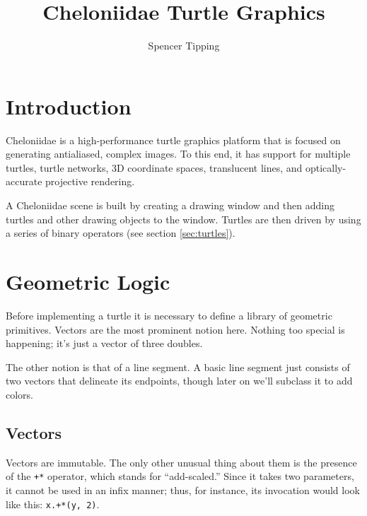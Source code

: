 \documentclass{article}
\title{Cheloniidae Turtle Graphics}
\author{Spencer Tipping}
\begin{document}
  \maketitle

  \tableofcontents

  \section{Introduction}
    \label{sec:introduction}

    Cheloniidae is a high-performance turtle graphics platform that is focused on generating antialiased, complex images. To this end, it has support for
    multiple turtles, turtle networks, 3D coordinate spaces, translucent lines, and optically-accurate projective rendering.

    A Cheloniidae scene is built by creating a drawing window and then adding turtles and other drawing objects to the window. Turtles are then driven by using
    a series of binary operators (see section \ref{sec:turtles}).

    \begin{scalacode}
object cheloniidae {

import java.awt.Color
import java.awt.Frame
    \end{scalacode}

  \section{Geometric Logic}
    \label{sec:geometric-logic}

    Before implementing a turtle it is necessary to define a library of geometric primitives. Vectors are the most prominent notion here. Nothing too special is
    happening; it's just a vector of three doubles.

    The other notion is that of a line segment. A basic line segment just consists of two vectors that delineate its endpoints, though later on we'll subclass
    it to add colors.

    \subsection{Vectors}
      \label{sec:vectors}

      Vectors are immutable. The only other unusual thing about them is the presence of the {\tt +*} operator, which stands for ``add-scaled.'' Since it takes
      two parameters, it cannot be used in an infix manner; thus, for instance, its invocation would look like this: {\tt x.+*(y, 2)}.
\end{document}
